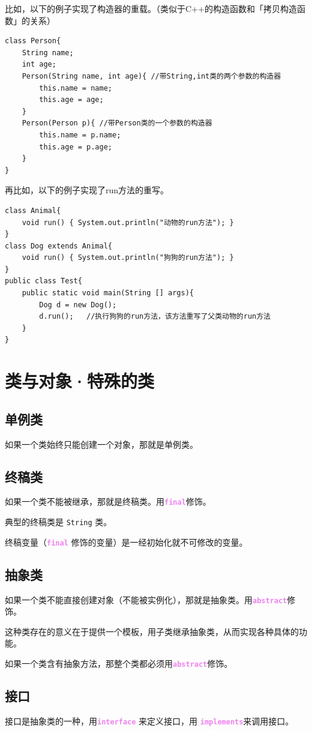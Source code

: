 \documentclass[UTF8]{ctexart}
\newcommand\keyword[1]{\textcolor{violet}{\textbf{\texttt{#1}}}}
\begin{document}
比如，以下的例子实现了构造器的重载。（类似于C++的构造函数和「拷贝构造函数」的关系）
\begin{lstlisting}
class Person{
    String name;
    int age;
    Person(String name, int age){ //带String,int类的两个参数的构造器
        this.name = name;
        this.age = age;
    }
    Person(Person p){ //带Person类的一个参数的构造器
        this.name = p.name;
        this.age = p.age;
    }
}
\end{lstlisting}

再比如，以下的例子实现了run方法的重写。
\begin{lstlisting}
class Animal{
    void run() { System.out.println("动物的run方法"); }
}
class Dog extends Animal{
    void run() { System.out.println("狗狗的run方法"); }
}
public class Test{
    public static void main(String [] args){
        Dog d = new Dog();
        d.run();   //执行狗狗的run方法，该方法重写了父类动物的run方法
    }
}
\end{lstlisting}

\section{类与对象·特殊的类}
\subsection{单例类}
如果一个类始终只能创建一个对象，那就是单例类。

\subsection{终稿类}
如果一个类不能被继承，那就是终稿类。用\keyword{final}修饰。

典型的终稿类是 \texttt{String} 类。

终稿变量（\keyword{final} 修饰的变量）是一经初始化就不可修改的变量。

\subsection{抽象类}
如果一个类不能直接创建对象（不能被实例化），那就是抽象类。用\keyword{abstract}修饰。

这种类存在的意义在于提供一个模板，用子类继承抽象类，从而实现各种具体的功能。

如果一个类含有抽象方法，那整个类都必须用\keyword{abstract}修饰。

\subsection{接口}
接口是抽象类的一种，用\keyword{interface} 来定义接口，用 \keyword{implements}来调用接口。
\end{document}
